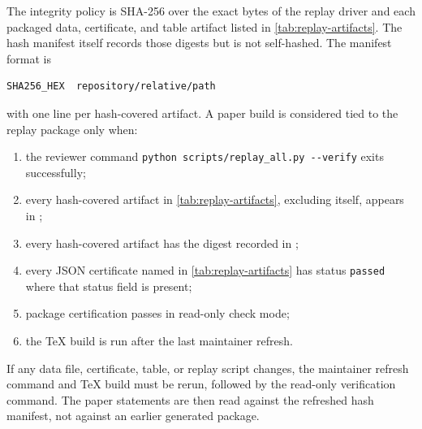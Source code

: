 The integrity policy is SHA-256 over the exact bytes of the replay driver and each packaged data, certificate, and table artifact listed in \cref{tab:replay-artifacts}. The hash manifest itself records those digests but is not self-hashed. The manifest format is
\begin{verbatim}
SHA256_HEX  repository/relative/path
\end{verbatim}
with one line per hash-covered artifact. A paper build is considered tied to the replay package only when:
\begin{enumerate}[label=(\roman*)]
\item the reviewer command \verb|python scripts/replay_all.py --verify| exits successfully;
\item every hash-covered artifact in \cref{tab:replay-artifacts}, excluding  itself, appears in ;
\item every hash-covered artifact has the digest recorded in ;
\item every JSON certificate named in \cref{tab:replay-artifacts} has status \texttt{passed} where that status field is present;
\item package certification passes in read-only check mode;
\item the TeX build is run after the last maintainer refresh.
\end{enumerate}
If any data file, certificate, table, or replay script changes, the maintainer refresh command and TeX build must be rerun, followed by the read-only verification command. The paper statements are then read against the refreshed hash manifest, not against an earlier generated package.